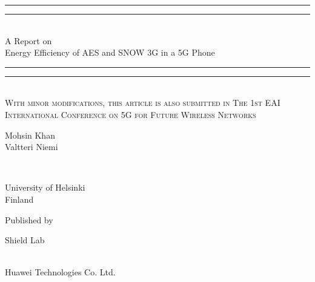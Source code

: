 \newcommand*{\titleGP}{\begingroup %
\centering %
\vspace*{\baselineskip} %

\rule{\textwidth}{1.6pt}\vspace*{-\baselineskip}\vspace*{2pt} %
\rule{\textwidth}{0.4pt}\\[\baselineskip] %

{\LARGE A Report on \\[0.3\baselineskip] Energy Efficiency of AES and SNOW 3G in a 5G Phone}\\[0.2\baselineskip] %

\rule{\textwidth}{0.4pt}\vspace*{-\baselineskip}\vspace{3.2pt} %
\rule{\textwidth}{1.6pt}\\[\baselineskip] %

\scshape %
With minor modifications, this article is also submitted in The 1st EAI International Conference on 5G for Future Wireless Networks  \\[\baselineskip] \par %

\vspace*{2\baselineskip} %

{\Large Mohsin Khan \\ Valtteri Niemi\par} %
\ulogo \\[0.3\baselineskip] %
{University of Helsinki \\ Finland\par} %

\vfill %

Published by \\[\baselineskip]
{\Large Shield Lab\par} %
\clogo \\[0.3\baselineskip] %
{\large Huawei Technologies Co. Ltd.}\par %

\endgroup}


 

\pagestyle{empty} %

\titleGP %


